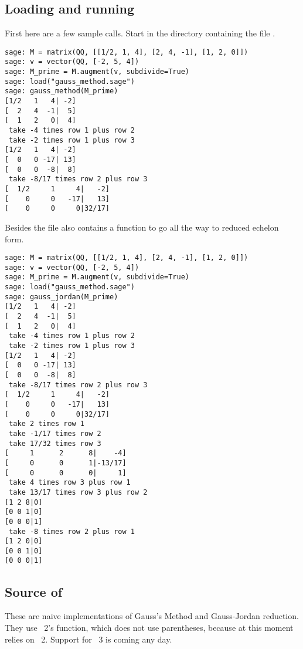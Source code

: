 \subsection{Loading and running}
First here are a few sample calls.
Start \Sage{} in the directory containing the file .
\begin{lstlisting}
sage: M = matrix(QQ, [[1/2, 1, 4], [2, 4, -1], [1, 2, 0]])
sage: v = vector(QQ, [-2, 5, 4])
sage: M_prime = M.augment(v, subdivide=True)
sage: load("gauss_method.sage")
sage: gauss_method(M_prime)
[1/2   1   4| -2]
[  2   4  -1|  5]
[  1   2   0|  4]
 take -4 times row 1 plus row 2
 take -2 times row 1 plus row 3
[1/2   1   4| -2]
[  0   0 -17| 13]
[  0   0  -8|  8]
 take -8/17 times row 2 plus row 3
[  1/2     1     4|   -2]
[    0     0   -17|   13]
[    0     0     0|32/17]
\end{lstlisting}

Besides  the file also contains a 
 function
to go all the way to reduced echelon form.
\begin{lstlisting}
sage: M = matrix(QQ, [[1/2, 1, 4], [2, 4, -1], [1, 2, 0]])
sage: v = vector(QQ, [-2, 5, 4])
sage: M_prime = M.augment(v, subdivide=True)
sage: load("gauss_method.sage")
sage: gauss_jordan(M_prime)
[1/2   1   4| -2]
[  2   4  -1|  5]
[  1   2   0|  4]
 take -4 times row 1 plus row 2
 take -2 times row 1 plus row 3
[1/2   1   4| -2]
[  0   0 -17| 13]
[  0   0  -8|  8]
 take -8/17 times row 2 plus row 3
[  1/2     1     4|   -2]
[    0     0   -17|   13]
[    0     0     0|32/17]
 take 2 times row 1
 take -1/17 times row 2
 take 17/32 times row 3
[     1      2      8|    -4]
[     0      0      1|-13/17]
[     0      0      0|     1]
 take 4 times row 3 plus row 1
 take 13/17 times row 3 plus row 2
[1 2 8|0]
[0 0 1|0]
[0 0 0|1]
 take -8 times row 2 plus row 1
[1 2 0|0]
[0 0 1|0]
[0 0 0|1]
\end{lstlisting}



\subsection{Source of \protect{}}

These are naive implementations of Gauss's Method and 
Gauss-Jordan reduction.
They use \python~2's  function, which
does not use parentheses, 
because at this moment \Sage{} relies on \python~2.
Support for \python~3 is coming any day.


\endinput


TODO:
